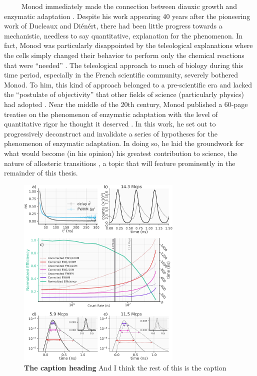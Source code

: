 \documentclass[12pt]{caltech_thesis}
\begin{document}
~~~~~Monod immediately made the connection between diauxic growth and
enzymatic adaptation \autocite{loison2013}. Despite his work appearing
40 years after the pioneering work of Ducleaux and Diénért, there had
been little progress towards a mechanistic, needless to say
quantitative, explanation for the phenomenon. In fact, Monod was
particularly disappointed by the teleological explanations where the
cells simply changed their behavior to perform only the chemical
reactions that were ``needed'' \autocite{loison2013}. The teleological
approach to much of biology during this time period, especially in the
French scientific community, severely bothered Monod. To him, this kind
of approach belonged to a pre-scientific era and lacked the ``postulate
of objectivity'' that other fields of science (particularly physics) had
adopted \autocite{loison2013}. Near the middle of the 20th century,
Monod published a 60-page treatise on the phenomenon of enzymatic
adaptation with the level of quantitative rigor he thought it deserved
\autocite{monod1947}. In this work, he set out to progressively
deconstruct and invalidate a series of hypotheses for the phenomenon of
enzymatic adaptation. In doing so, he laid the groundwork for what would
become (in his opinion) his greatest contribution to science, the nature
of allosteric transitions \autocite{loison2013,monod1963,monod1965}, a
topic that will feature prominently in the remainder of this thesis.

\hypertarget{fig:custom_figure}{%
\begin{figure}
\centering
\includegraphics[width=0.7\textwidth,height=\textheight]{chapter_01/figs/Figure_Data_Sept_2022.pdf}
\caption[{The second first caption.}]{\textbf{The caption heading} And I
think the rest of this is the caption}
\label{fig:custom_figure}
\end{figure}
}
\end{document}
